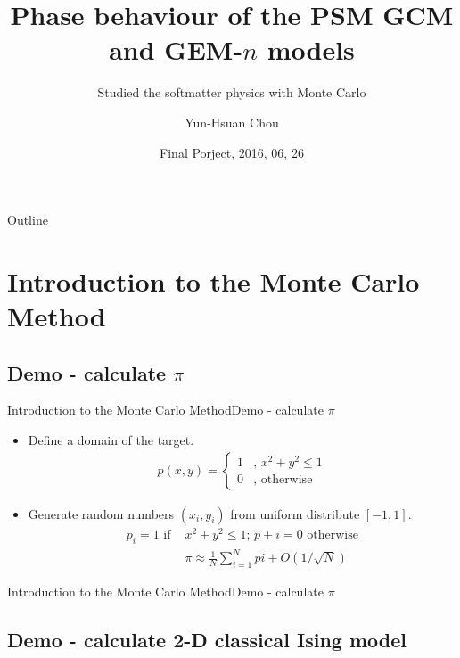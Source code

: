 \documentclass{beamer}
\title{Phase behaviour of the PSM GCM and GEM-$n$ models}
\subtitle{Studied the softmatter physics with Monte Carlo}
\author{Yun-Hsuan Chou}
\institute[NTU] %
{
	\inst{1}%
	Department of Pysics\\
	National Taiwan University
}
\date{Final Porject, 2016, 06, 26}
\begin{document}
\begin{frame}
\titlepage
\end{frame}

\begin{frame}{Outline}
\tableofcontents
\end{frame}

\section{Introduction to the Monte Carlo Method}

\subsection{Demo - calculate $\pi$}

\begin{frame}{Introduction to the Monte Carlo Method}{Demo - calculate $\pi$}
\begin{itemize}
\item {
	Define a domain of the target.
	\begin{align}
		p(x,y) = \begin{cases}
			1 & \text{, } x^2 + y^2 \leq 1 \\
			0 & \text{, otherwise} 
		\end{cases}
	\end{align}
}
\item {
	Generate random numbers $(x_i, y_i)$ from uniform distribute $[-1, 1]$.
	\begin{align}	
		p_i = 1 \text{ if } &x^2+y^2 \leq 1\text{; } p+i = 0 \text{ otherwise} \\
		&\pi \approx \frac{1}{N} \sum_{i=1}^{N} pi + O( 1 / \sqrt{N})
	\end{align}
}
\end{itemize}
\end{frame}

\begin{frame}{Introduction to the Monte Carlo Method}{Demo - calculate $\pi$}

\end{frame}

\subsection{Demo - calculate 2-D classical Ising model}
\end{document}

